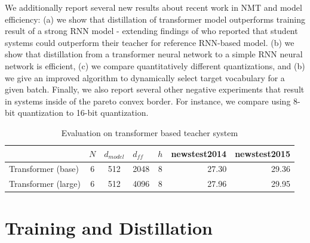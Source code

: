 \documentclass[11pt,a4paper]{article}
\begin{document}
We additionally report several new results about recent work in NMT
and model efficiency: (a) we show that distillation of transformer
model outperforms training result of a strong RNN model - extending
findings of \cite{DBLP:journals/corr/CregoS16} who reported that
student systems could outperform their teacher for reference RNN-based
model. (b) we show that distillation from a transformer neural network
to a simple RNN neural network is efficient, (c) we compare
quantitatively different quantizations, and (b) we give an improved
algorithm to dynamically select  target vocabulary for a given batch.
Finally, we also report several other negative experiments that
result in  systems inside of the pareto convex border. For instance, we
compare using 8-bit quantization to 16-bit quantization.


\begin{table}[]
\centering
\begin{tabular}{lccccrr}
\hline
                    & \multicolumn{1}{l}{\(\displaystyle N \)} & \multicolumn{1}{l}{\(\displaystyle d_{model} \)} & \multicolumn{1}{l}{\(\displaystyle d_{ff} \)} & \multicolumn{1}{l}{\(\displaystyle h \)} & \multicolumn{1}{l}{newstest2014} & \multicolumn{1}{l}{newstest2015} \\ \hline
Transformer (base)  & 6                     & 512                        & 2048                  & 8                        & 27.30                            & 29.36                            \\ \hline
Transformer (large) & 6                     & 512                        & 4096                  & 8                        & 27.96                            & 29.95                            \\ \hline
\end{tabular}
\caption{Evaluation on transformer based teacher system}
\label{table:transformer}
\end{table}

\section{Training and Distillation}

\end{document}
